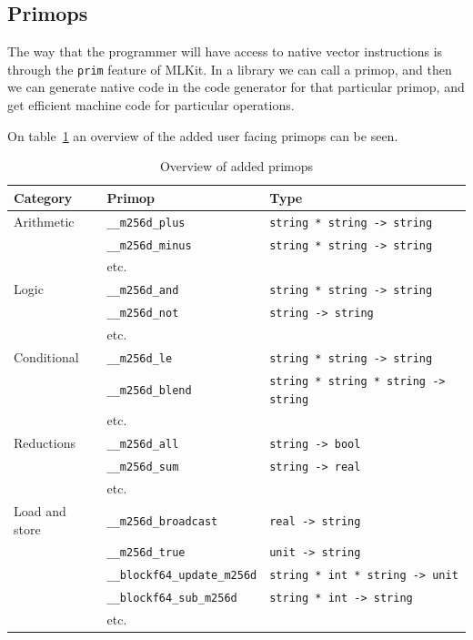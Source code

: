 \documentclass{article}
\begin{document}
\subsection{Primops}
The way that the programmer will have access to native vector instructions is through the \texttt{prim} feature of MLKit. In a library we can call a primop, and then we can generate native code in the code generator for that particular primop, and get efficient machine code for particular operations.

On table~\ref{tbl:primops} an overview of the added user facing primops can be seen.
\begin{table}
\begin{adjustbox}{width=\columnwidth,center}
\begin{tabular}{l l l}
    \toprule
    Category & Primop & Type \\
    \midrule
    Arithmetic & \verb!__m256d_plus! & \verb!string * string -> string! \\
                & \verb!__m256d_minus! & \verb!string * string -> string! \\
                & etc. & \\
                \midrule 
    Logic       & \verb!__m256d_and! & \verb!string * string -> string! \\
                & \verb!__m256d_not! & \verb!string -> string! \\
                & etc. & \\
                \midrule 
    Conditional & \verb!__m256d_le! & \verb!string * string -> string! \\
                & \verb!__m256d_blend! & \verb!string * string * string -> string! \\
                & etc. & \\
                \midrule 
    Reductions  & \verb!__m256d_all! & \verb!string -> bool! \\
                & \verb!__m256d_sum! & \verb!string -> real! \\
                & etc. & \\
                \midrule 
    Load and store & \verb!__m256d_broadcast! & \verb!real -> string! \\
                   & \verb!__m256d_true! & \verb!unit -> string! \\
                   & \verb!__blockf64_update_m256d! & \verb!string * int * string -> unit! \\
                   & \verb!__blockf64_sub_m256d! & \verb!string * int -> string! \\
                   & etc. & \\
                   \bottomrule
\end{tabular}
\end{adjustbox}
\caption{Overview of added primops}
\label{tbl:primops}
\end{table}
\end{document}
